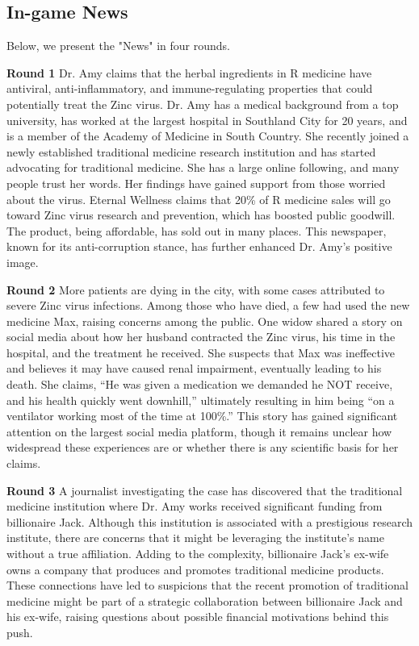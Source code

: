 \subsection{In-game News}
Below, we present the "News" in four rounds. 

\textbf{Round 1}
Dr. Amy claims that the herbal ingredients in R medicine have antiviral, anti-inflammatory, and immune-regulating properties that could potentially treat the Zinc virus. Dr. Amy has a medical background from a top university, has worked at the largest hospital in Southland City for 20 years, and is a member of the Academy of Medicine in South Country. She recently joined a newly established traditional medicine research institution and has started advocating for traditional medicine. She has a large online following, and many people trust her words. Her findings have gained support from those worried about the virus. Eternal Wellness claims that 20\% of  R medicine sales will go toward Zinc virus research and prevention, which has boosted public goodwill. The product, being affordable, has sold out in many places. This newspaper, known for its anti-corruption stance, has further enhanced Dr. Amy’s positive image.

\textbf{Round 2} More patients are dying in the city, with some cases attributed to severe Zinc virus infections. Among those who have died, a few had used the new medicine Max, raising concerns among the public. One widow shared a story on social media about how her husband contracted the Zinc virus, his time in the hospital, and the treatment he received. She suspects that Max was ineffective and believes it may have caused renal impairment, eventually leading to his death. She claims, “He was given a medication we demanded he NOT receive, and his health quickly went downhill,” ultimately resulting in him being “on a ventilator working most of the time at 100\%.” This story has gained significant attention on the largest social media platform, though it remains unclear how widespread these experiences are or whether there is any scientific basis for her claims.

\textbf{Round 3} A journalist investigating the case has discovered that the traditional medicine institution where Dr. Amy works received significant funding from billionaire Jack. Although this institution is associated with a prestigious research institute, there are concerns that it might be leveraging the institute’s name without a true affiliation. Adding to the complexity, billionaire Jack's ex-wife owns a company that produces and promotes traditional medicine products. These connections have led to suspicions that the recent promotion of traditional medicine might be part of a strategic collaboration between billionaire Jack and his ex-wife, raising questions about possible financial motivations behind this push.

